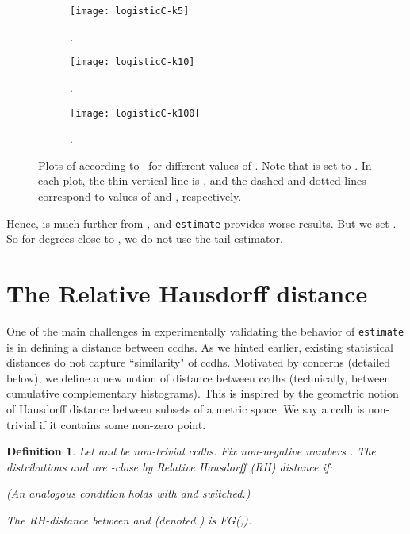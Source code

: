 \documentclass[11pt]{article}
\newtheorem{definition}{Definition}
\theoremstyle{definition}
\def\eps{\varepsilon}
\newcommand{\est}{{\tt estimate}}
\begin{document}
\begin{figure*}[t]
    \centering
    \begin{subfigure}[b]{0.3\textwidth}
        \centering \texttt{[image: logisticC-k5]}
        \caption{.}
        \label{fig:logisticC-k5}
    \end{subfigure}
    \hfill
    \begin{subfigure}[b]{0.3\textwidth}
        \centering \texttt{[image: logisticC-k10]}
        \caption{.}
        \label{fig:logisticC-k10}
    \end{subfigure}
    \hfill
    \begin{subfigure}[b]{0.3\textwidth}
        \centering \texttt{[image: logisticC-k100]}
        \caption{.}
        \label{fig:logisticC-k100}
    \end{subfigure}
    \caption{Plots of  according to~ for different values of . Note that  is set to . In each
    plot, the thin vertical line is , and the dashed and dotted lines
correspond to values of  and , respectively.}
    \label{fig:step}
\end{figure*}






Hence,  is much further from ,
and \est{} provides worse results. But we set . So for degrees
close to , we do not use the tail estimator.

\section{The Relative Hausdorff distance} \label{sec:rh}

One of the main challenges in experimentally validating the behavior of \est{} is
in defining a distance between ccdhs. As we hinted earlier, existing statistical distances
do not capture ``similarity" of ccdhs.
Motivated by concerns (detailed below), we define a new notion of distance between ccdhs (technically,
between cumulative complementary histograms).
This is inspired by the geometric notion of Hausdorff distance between subsets of a metric space.
We say a ccdh is non-trivial
if it contains some non-zero point.

\begin{definition} \label{def:hauss} Let  and  be non-trivial ccdhs. Fix non-negative numbers .
The distributions  and  are \emph{-close by Relative Hausdorff (RH) distance} if:

(An analogous condition holds with  and  switched.)

The \emph{RH}-distance between  and  (denoted ) is  FG(\eps,\eps).
\end{definition}
\end{document}
